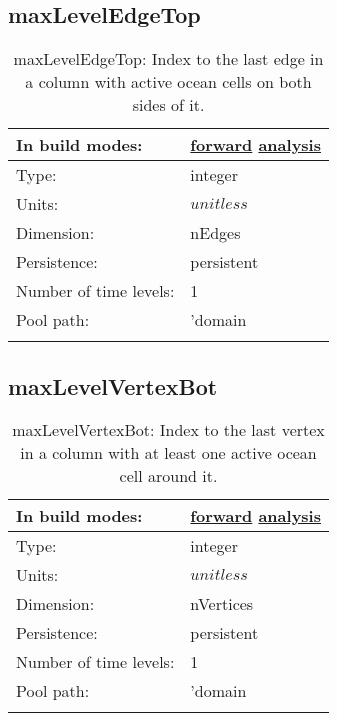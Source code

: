 \subsection[maxLevelEdgeTop]{maxLevelEdgeTop}
\label{subsec:var_sec_mesh_maxLevelEdgeTop}
\begin{center}
\begin{longtable}{| p{2.0in} | p{4.0in} |}
        \hline 
        In build modes: & \hyperref[subsec:forward_var_tab_mesh]{forward} \hyperref[subsec:analysis_var_tab_mesh]{analysis} \\
        \hline 
        Type: & integer \\
        \hline 
        Units: & $unitless$ \\
        \hline 
        Dimension: & nEdges \\
        \hline 
        Persistence: & persistent \\
        \hline 
        Number of time levels: & 1 \\
        \hline 
            Pool path: & 'domain %
 \\
		 \hline 
    \caption{maxLevelEdgeTop: Index to the last edge in a column with active ocean cells on both sides of it.}
\end{longtable}
\end{center}
\subsection[maxLevelVertexBot]{maxLevelVertexBot}
\label{subsec:var_sec_mesh_maxLevelVertexBot}
\begin{center}
\begin{longtable}{| p{2.0in} | p{4.0in} |}
        \hline 
        In build modes: & \hyperref[subsec:forward_var_tab_mesh]{forward} \hyperref[subsec:analysis_var_tab_mesh]{analysis} \\
        \hline 
        Type: & integer \\
        \hline 
        Units: & $unitless$ \\
        \hline 
        Dimension: & nVertices \\
        \hline 
        Persistence: & persistent \\
        \hline 
        Number of time levels: & 1 \\
        \hline 
            Pool path: & 'domain %
 \\
		 \hline 
    \caption{maxLevelVertexBot: Index to the last vertex in a column with at least one active ocean cell around it.}
\end{longtable}
\end{center}
